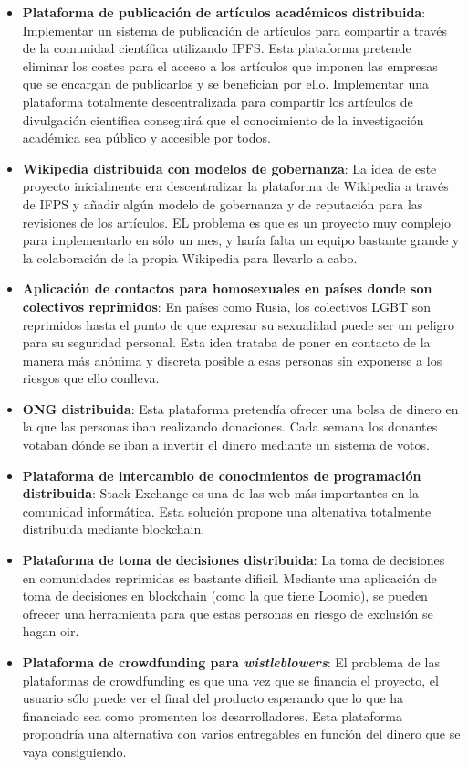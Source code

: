 \begin{itemize}
  \item \textbf{Plataforma de publicación de artículos académicos distribuida}: Implementar un sistema de publicación de artículos para compartir a través de la comunidad científica utilizando IPFS. Esta plataforma pretende eliminar los costes para el acceso a los artículos que imponen las empresas que se encargan de publicarlos y se benefician por ello. Implementar una plataforma totalmente descentralizada para compartir los artículos de divulgación científica conseguirá que el conocimiento de la investigación académica sea público y accesible por todos.

  \item \textbf{Wikipedia distribuida con modelos de gobernanza}: La idea de este proyecto inicialmente era descentralizar la plataforma de Wikipedia a través de IFPS y añadir algún modelo de gobernanza y de reputación para las revisiones de los artículos. EL problema es que es un proyecto muy complejo para implementarlo en sólo un mes, y haría falta un equipo bastante grande y la colaboración de la propia Wikipedia para llevarlo a cabo.

  \item \textbf{Aplicación de contactos para homosexuales en países donde son colectivos reprimidos}: En países como Rusia, los colectivos LGBT son reprimidos hasta el punto de que expresar su sexualidad puede ser un peligro para su seguridad personal. Esta idea trataba de poner en contacto de la manera más anónima y discreta posible a esas personas sin exponerse a los riesgos que ello conlleva.

  \item \textbf{ONG distribuida}: Esta plataforma pretendía ofrecer una bolsa de dinero en la que las personas iban realizando donaciones. Cada semana los donantes votaban dónde se iban a invertir el dinero mediante un sistema de votos.

  \item \textbf{Plataforma de intercambio de conocimientos de programación distribuida}: Stack Exchange es una de las web más importantes en la comunidad informática. Esta solución propone una altenativa totalmente distribuida mediante blockchain.

  \item \textbf{Plataforma de toma de decisiones distribuida}: La toma de decisiones en comunidades reprimidas es bastante dificil. Mediante una aplicación de toma de decisiones en blockchain (como la que tiene Loomio), se pueden ofrecer una herramienta para que estas personas en riesgo de exclusión se hagan oir.

  \item \textbf{Plataforma de crowdfunding para \textit{wistleblowers}}: El problema de las plataformas de crowdfunding es que una vez que se financia el proyecto, el usuario sólo puede ver el final del producto esperando que lo que ha financiado sea como promenten los desarrolladores. Esta plataforma propondría una alternativa con varios entregables en función del dinero que se vaya consiguiendo.


\end{itemize}

